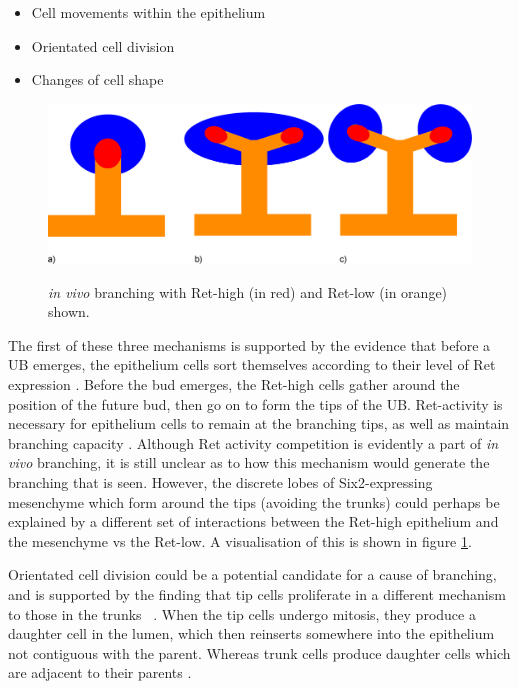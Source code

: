 \documentclass[pdftex,10pt,a4paper,twocolumn]{article}
\begin{document}
\begin{itemize}
\item Cell movements within the epithelium
\item Orientated cell division
\item Changes of cell shape
\end{itemize}

\begin{figure}[t] 
\centering
\scalebox{0.2} 
{\includegraphics{UB_branch_ret.eps}}
\caption{\textit{in vivo} branching with Ret-high (in red) and Ret-low (in orange) shown.}\label{fig:branch_ret}
\end{figure} 

The first of these three mechanisms is supported by the evidence that before a UB emerges, the epithelium cells sort themselves according to their level of Ret expression \cite{Chi2009}. Before the bud emerges, the Ret-high cells gather around the position of the future bud, then go on to form the tips of the UB. Ret-activity is necessary for epithelium cells to remain at the branching tips, as well as maintain branching capacity \cite{Chi2009}. Although Ret activity competition is evidently a part of \textit{in vivo} branching, it is still unclear as to how this mechanism would generate the branching that is seen. However, the discrete lobes of Six2-expressing mesenchyme which form around the tips (avoiding the trunks) could perhaps be explained by a different set of interactions between the Ret-high epithelium and the mesenchyme vs the Ret-low. A visualisation of this is shown in figure \ref{fig:branch_ret}.

Orientated cell division could be a potential candidate for a cause of branching, and is supported by the finding that tip cells proliferate in a different mechanism to those in the trunks ~\cite{packard2013luminal}. When the tip cells undergo mitosis, they produce a daughter cell in the lumen, which then reinserts somewhere into the epithelium not contiguous with the parent. Whereas trunk cells produce daughter cells which are adjacent to their parents \cite{packard2013luminal}.
\end{document}

